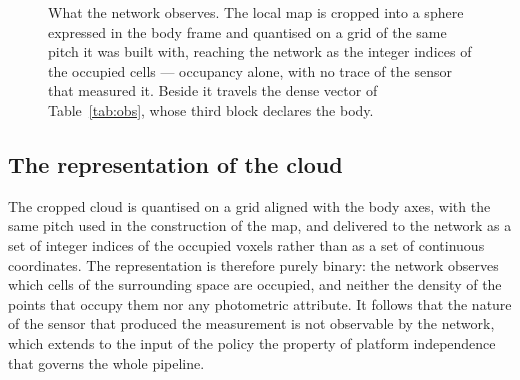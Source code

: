 \begin{figure}[htbp]
  \centering
  \linespread{1}\selectfont
  \caption{What the network observes. The local map is cropped into a sphere
           expressed in the body frame and quantised on a grid of the same pitch
           it was built with, reaching the network as the integer indices of the
           occupied cells --- occupancy alone, with no trace of the sensor that
           measured it. Beside it travels the dense vector of
           Table~\ref{tab:obs}, whose third block declares the body.}
  \label{fig:observation}
\end{figure}

\subsection{The representation of the cloud}
\label{sec:observation-cloud}

The cropped cloud is quantised on a grid aligned with the body axes, with the
same pitch used in the construction of the map, and delivered to the network as
a set of integer indices of the occupied voxels rather than as a set of
continuous coordinates. The representation is therefore purely binary: the
network observes which cells of the surrounding space are occupied, and neither
the density of the points that occupy them nor any photometric attribute. It
follows that the nature of the sensor that produced the measurement is not
observable by the network, which extends to the input of the policy the property
of platform independence that governs the whole pipeline.

